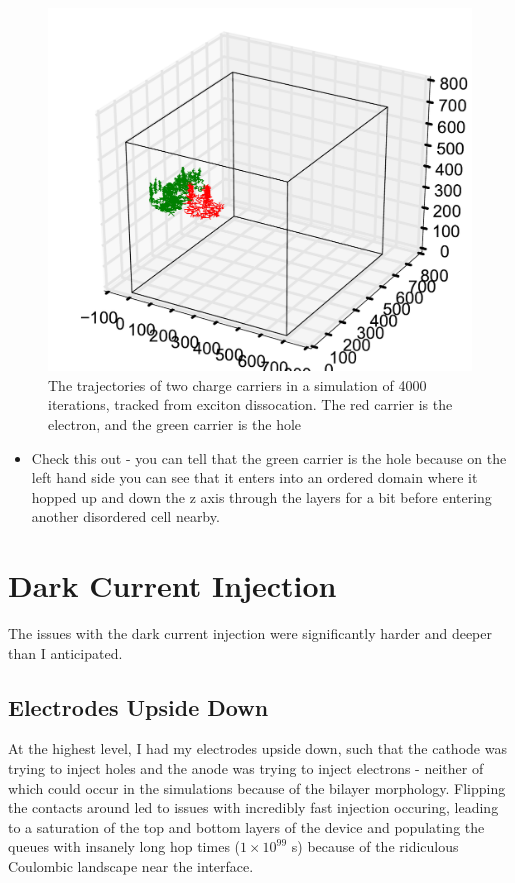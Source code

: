 \documentclass[12pt]{article}
\begin{document}
\begin{figure}[h!]\centering
	\includegraphics[width=\textwidth]{Figures/3d_trajectory.pdf}
    \caption{The trajectories of two charge carriers in a simulation of 4000 iterations, tracked from exciton dissocation. The red carrier is the electron, and the green carrier is the hole}
	\label{fig:3dTrajectory}
\end{figure}


\begin{itemize}
    \item{Check this out - you can tell that the green carrier is the hole because on the left hand side you can see that it enters into an ordered domain where it hopped up and down the z axis through the layers for a bit before entering another disordered cell nearby.}
\end{itemize}

\clearpage

\section{Dark Current Injection}

The issues with the dark current injection were significantly harder and deeper than I anticipated.

\subsection{Electrodes Upside Down}
At the highest level, I had my electrodes upside down, such that the cathode was trying to inject holes and the anode was trying to inject electrons - neither of which could occur in the simulations because of the bilayer morphology.
Flipping the contacts around led to issues with incredibly fast injection occuring, leading to a saturation of the top and bottom layers of the device and populating the queues with insanely long hop times ($1 \times 10^{99}$ s) because of the ridiculous Coulombic landscape near the interface.
\end{document}
